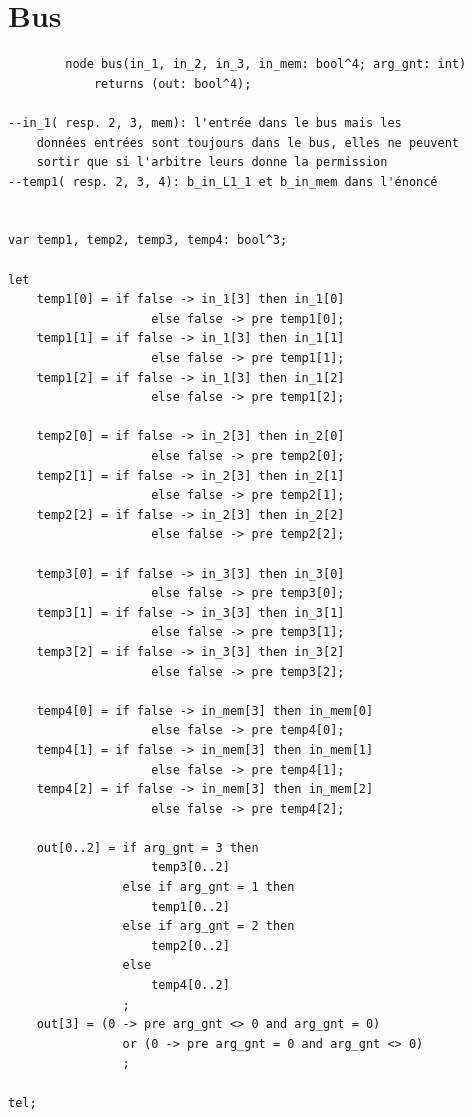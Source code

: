 \documentclass[a4paper,11pt]{report}
\begin{document}
\chapter{Bus}
	\begin{framed}
		\begin{verbatim}
		node bus(in_1, in_2, in_3, in_mem: bool^4; arg_gnt: int) 
			returns (out: bool^4);

--in_1( resp. 2, 3, mem): l'entrée dans le bus mais les 
	données entrées sont toujours dans le bus, elles ne peuvent 
	sortir que si l'arbitre leurs donne la permission
--temp1( resp. 2, 3, 4): b_in_L1_1 et b_in_mem dans l'énoncé


var temp1, temp2, temp3, temp4: bool^3;

let
    temp1[0] = if false -> in_1[3] then in_1[0]
                    else false -> pre temp1[0];
    temp1[1] = if false -> in_1[3] then in_1[1]
                    else false -> pre temp1[1];
    temp1[2] = if false -> in_1[3] then in_1[2]
                    else false -> pre temp1[2];

    temp2[0] = if false -> in_2[3] then in_2[0]
                    else false -> pre temp2[0];
    temp2[1] = if false -> in_2[3] then in_2[1]
                    else false -> pre temp2[1];
    temp2[2] = if false -> in_2[3] then in_2[2]
                    else false -> pre temp2[2];

    temp3[0] = if false -> in_3[3] then in_3[0]
                    else false -> pre temp3[0];
    temp3[1] = if false -> in_3[3] then in_3[1]
                    else false -> pre temp3[1];
    temp3[2] = if false -> in_3[3] then in_3[2]
                    else false -> pre temp3[2];

    temp4[0] = if false -> in_mem[3] then in_mem[0]
                    else false -> pre temp4[0];
    temp4[1] = if false -> in_mem[3] then in_mem[1]
                    else false -> pre temp4[1];
    temp4[2] = if false -> in_mem[3] then in_mem[2]
                    else false -> pre temp4[2];

    out[0..2] = if arg_gnt = 3 then
                    temp3[0..2]
                else if arg_gnt = 1 then
                    temp1[0..2]
                else if arg_gnt = 2 then
                    temp2[0..2]
                else
                    temp4[0..2]
                ;
    out[3] = (0 -> pre arg_gnt <> 0 and arg_gnt = 0)
                or (0 -> pre arg_gnt = 0 and arg_gnt <> 0)
                ;

tel;

		\end{verbatim}
	\end{framed}
\end{document}
